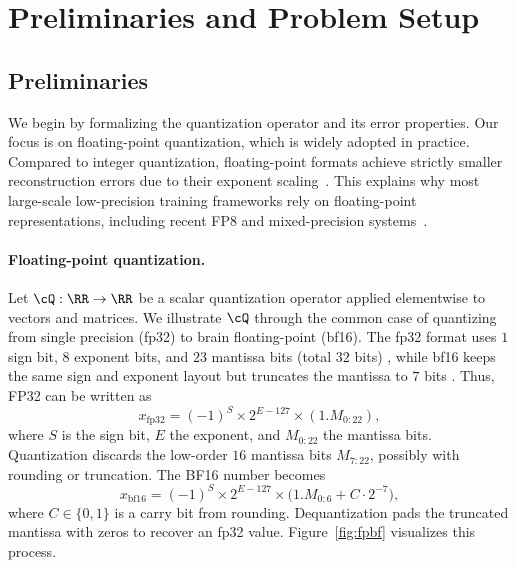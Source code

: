 \documentclass[11pt, letterpaper]{article}
\begin{document}

\section{Preliminaries and Problem Setup}\label{sec:prelim_setup}


\subsection{Preliminaries}
\label{sec:prelim}

We begin by formalizing the quantization operator and its error properties. 
Our focus is on floating-point quantization, which is widely adopted in practice. 
Compared to integer quantization, floating-point formats achieve strictly smaller reconstruction errors due to their exponent scaling~\citep{kuzmin2022fp8}. 
This explains why most large-scale low-precision training frameworks rely on floating-point representations, including recent FP8 and mixed-precision systems~\citep{peng2023fp8, liu2024deepseek, fishman2025scaling}. 

\paragraph{Floating-point quantization.} 
Let $\cQ:\RR \to \RR$ be a scalar quantization operator applied elementwise to vectors and matrices. 
We illustrate $\cQ$ through the common case of quantizing from single precision (fp32) to brain floating-point (bf16). 
The fp32 format uses $1$ sign bit, $8$ exponent bits, and $23$ mantissa bits (total $32$ bits) \citep{IEEE754}, while bf16 keeps the same sign and exponent layout but truncates the mantissa to $7$ bits \citep{wang2019bfloat16}. 
Thus, FP32 can be written as
\[
x_{\text{fp32}} = (-1)^{S}\times 2^{E-127}\times (1.M_{0:22}),
\]
where $S$ is the sign bit, $E$ the exponent, and $M_{0:22}$ the mantissa bits. 
Quantization discards the low-order $16$ mantissa bits $M_{7:22}$, possibly with rounding or truncation. 
The BF16 number becomes
\[
x_{\text{bf16}} = (-1)^{S}\times 2^{E-127}\times \big(1.M_{0:6} + C \cdot 2^{-7}\big),
\]
where $C\in\{0,1\}$ is a carry bit from rounding. Dequantization pads the truncated mantissa with zeros to recover an fp32 value. 
Figure~\ref{fig:fpbf} visualizes this process.
\end{document}
